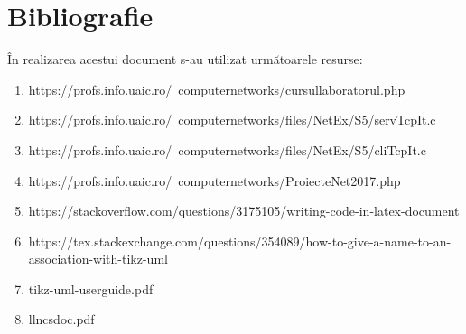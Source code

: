 \documentclass{llncs}
\begin{document}
\section{Bibliografie}
%
În realizarea acestui document s-au utilizat următoarele resurse:
%
\begin{enumerate}
\item https://profs.info.uaic.ro/~computernetworks/cursullaboratorul.php
\item https://profs.info.uaic.ro/~computernetworks/files/NetEx/S5/servTcpIt.c
\item https://profs.info.uaic.ro/~computernetworks/files/NetEx/S5/cliTcpIt.c
\item https://profs.info.uaic.ro/~computernetworks/ProiecteNet2017.php
\item https://stackoverflow.com/questions/3175105/writing-code-in-latex-document
\item https://tex.stackexchange.com/questions/354089/how-to-give-a-name-to-an-association-with-tikz-uml
\item tikz-uml-userguide.pdf
\item llncsdoc.pdf
\end{enumerate}
\end{document}
